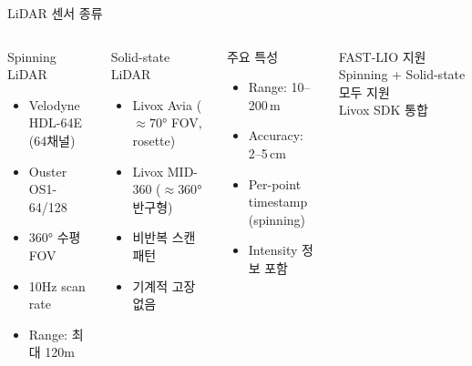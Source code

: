 \begin{frame}{LiDAR 센서 종류}
  \begin{columns}
    \begin{block}{Spinning LiDAR}
      \begin{itemize}
        \item Velodyne HDL-64E (64채널)
        \item Ouster OS1-64/128
        \item 360° 수평 FOV
        \item 10Hz scan rate
        \item Range: 최대 120m
      \end{itemize}
    \end{block}
    \begin{block}{Solid-state LiDAR}
      \begin{itemize}
        \item Livox Avia ($\approx70°$ FOV, rosette)
        \item Livox MID-360 ($\approx360°$ 반구형)
        \item 비반복 스캔 패턴
        \item 기계적 고장 없음
      \end{itemize}
    \end{block}
    \begin{block}{주요 특성}
      \begin{itemize}
        \item Range: 10--200\,m
        \item Accuracy: 2--5\,cm
        \item Per-point timestamp (spinning)
        \item Intensity 정보 포함
      \end{itemize}
    \end{block}
    \begin{exampleblock}{FAST-LIO 지원}
      Spinning + Solid-state 모두 지원\\
      Livox SDK 통합
    \end{exampleblock}
  \end{columns}
\end{frame}

